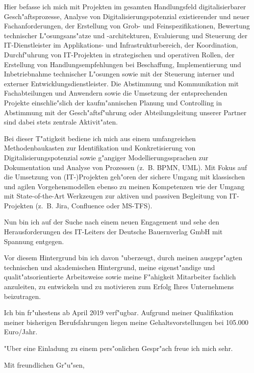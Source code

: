 \documentclass[10pt,a4paper]{dinbrief}
\begin{document}
\begin{letter}
Hier befasse ich mich mit Projekten im gesamten Handlungsfeld digitalisierbarer Gesch"aftsprozesse, Analyse von Digitalisierungspotenzial existierender und neuer Fachanforderungen, der Erstellung von Grob- und Feinspezifikationen, Bewertung technischer L"osungsans"atze und -architekturen, Evaluierung und Steuerung der IT-Dienstleister im Applikations- und Infrastrukturbereich, der Koordination, Durch\-f"uhrung von IT-Projekten in strategischen und operativen Rollen, der Erstellung von Handlungsempfehlungen bei Beschaffung, Implementierung und Inbetriebnahme technischer L"osungen sowie mit der Steuerung interner und externer Entwicklungsdienstleister. Die Abstimmung und Kommunikation mit Fachabteilungen und Anwendern sowie die Umsetzung der entsprechenden Projekte einschlie"slich der kaufm"annischen Planung und Controlling in Abstimmung mit der Gesch"aftsf"uhrung oder Abteilungsleitung unserer Partner sind dabei stets zentrale Aktivit"aten.

Bei dieser T"atigkeit bediene ich mich aus einem umfangreichen Methodenbaukasten zur Identifikation und Konkretisierung von Digitalisierungspotenzial sowie g"angiger Modellierungssprachen zur Dokumentation und Analyse von Prozessen (z.~B. BPMN, UML). Mit Fokus auf die Umsetzung von (IT-)Projekten geh"oren der sichere Umgang mit klassischen und agilen Vorgehensmodellen ebenso zu meinen Kompetenzen wie der Umgang mit State-of-the-Art Werkzeugen zur aktiven und passiven Begleitung von IT-Projekten (z.~B. Jira, Confluence oder MS-TFS).

Nun bin ich auf der Suche nach einem neuen Engagement und sehe den Herausforderungen des IT-Leiters der Deutsche Bauernverlag GmbH mit Spannung entgegen.

Vor diesem Hintergrund bin ich davon "uberzeugt, durch meinen ausgepr"agten technischen und akademischen Hintergrund, meine eigenst"andige und qualit"atsorientierte Arbeitsweise sowie meine F"ahigkeit Mitarbeiter fachlich anzuleiten, zu entwickeln und zu motivieren zum Erfolg Ihres Unternehmens beizutragen.

Ich bin fr"uhestens ab April 2019 verf"ugbar. Aufgrund meiner Qualifikation meiner bisherigen Berufsfahrungen liegen meine Gehaltsvorstellungen bei 105.000 Euro/Jahr. 

"Uber eine Einladung zu einem pers"onlichen Gespr"ach freue ich mich sehr.

\closing{Mit freundlichen Gr"u"sen,}
\end{letter}
\end{document}
